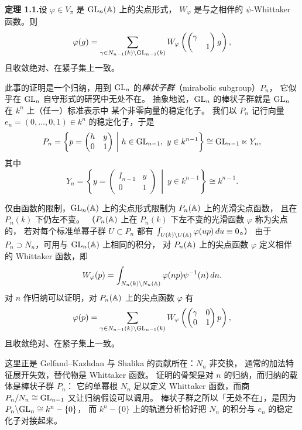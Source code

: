 \textbf{定理 1.1.}\quad 设 $\varphi\in V_\pi$ 是 $\mathrm{GL}_n(\mathbb{A})$ 上的尖点形式，
$W_\varphi$ 是与之相伴的 $\psi$-Whittaker 函数。则
\[
\varphi(g)=\sum_{\gamma\in N_{n-1}(k)\backslash\mathrm{GL}_{n-1}(k)}
W_\varphi\left(\begin{pmatrix}\gamma&\\&1\end{pmatrix}g\right),
\]
且收敛绝对、在紧子集上一致。

此事的证明是一个归纳，用到 $\mathrm{GL}_n$ 的\emph{棒状子群}（mirabolic subgroup）$P_n$，
它似乎在 $\mathrm{GL}_n$ 自守形式的研究中无处不在。
抽象地说，$\mathrm{GL}_n$ 的棒状子群就是 $\mathrm{GL}_n$ 在 $k^n$ 上（任一）标准表示中
某个非零向量的稳定化子。
我们以 $P_n$ 记行向量 $e_n=(0,\ldots,0,1)\in k^n$ 的稳定化子，于是
\[
P_n=\left\{p=\begin{pmatrix}h&y\\0&1\end{pmatrix}\ \middle|\ h\in\GL_{n-1},\ y\in k^{n-1}\right\}
\cong\GL_{n-1}\ltimes Y_n,
\]
其中
\[
Y_n=\left\{y=\begin{pmatrix}I_{n-1}&y\\0&1\end{pmatrix}\ \middle|\ y\in k^{n-1}\right\}\cong k^{n-1}.
\]

仅由函数的限制，$\mathrm{GL}_n(\mathbb{A})$ 上的尖点形式限制为 $P_n(\mathbb{A})$ 上的光滑尖点函数，
且在 $P_n(k)$ 下仍左不变。
（$P_n(\mathbb{A})$ 上在 $P_n(k)$ 下左不变的光滑函数 $\varphi$ 称为尖点的，
若对每个标准单幂子群 $U\subset P_n$ 都有
$\int_{U(k)\backslash U(\mathbb{A})}\varphi(up)\,du\equiv0$。）
由于 $P_n\supset N_n$，可用与 $\mathrm{GL}_n(\mathbb{A})$ 上相同的积分，
对 $P_n(\mathbb{A})$ 上的尖点函数 $\varphi$ 定义相伴的 Whittaker 函数，即
\[
W_\varphi(p)=\int_{N_n(k)\backslash N_n(\mathbb{A})}\varphi(np)\psi^{-1}(n)\,dn.
\]
对 $n$ 作归纳可以证明，对 $P_n(\mathbb{A})$ 上的尖点函数 $\varphi$ 有
\[
\varphi(p)=\sum_{\gamma\in N_{n-1}(k)\backslash\mathrm{GL}_{n-1}(k)}
W_\varphi\left(\begin{pmatrix}\gamma&0\\0&1\end{pmatrix}p\right),
\]
且收敛绝对、在紧子集上一致。
\begin{annote}
这里正是 Gelfand--Kazhdan 与 Shalika 的贡献所在：$N_n$ 非交换，
通常的加法特征展开失效，替代物是 Whittaker 函数。
证明的骨架是对 $n$ 的归纳，而归纳的载体是棒状子群 $P_n$：
它的单幂根 $N_n$ 足以定义 Whittaker 函数，而商 $P_n/N_n\cong\mathrm{GL}_{n-1}$
又让归纳假设可以调用。
棒状子群之所以「无处不在」，是因为 $P_n\backslash\mathrm{GL}_n\cong k^n-\{0\}$，
而 $k^n-\{0\}$ 上的轨道分析恰好把 $N_n$ 的积分与 $e_n$ 的稳定化子对接起来。
\par{}
\end{annote}

